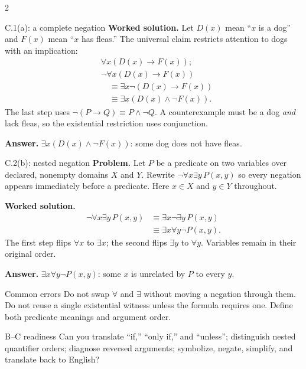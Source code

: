 \documentclass[10pt]{article}
\begin{document}
\begin{multicols}{2}
\begin{workedbox}{C.1(a): a complete negation}
\textbf{Worked solution.} Let $D(x)$ mean ``$x$ is a dog'' and $F(x)$ mean
``$x$ has fleas.'' The universal claim restricts attention to dogs with an
implication:
\[
\begin{aligned}
&\forall x(D(x)\to F(x));\\
&\neg\forall x(D(x)\to F(x))\\
&\quad\equiv\exists x\neg(D(x)\to F(x))\\
&\quad\equiv\exists x(D(x)\land\neg F(x)).
\end{aligned}
\]
The last step uses $\neg(P\to Q)\equiv P\land\neg Q$. A counterexample must
be a dog \emph{and} lack fleas, so the existential restriction uses conjunction.

\textbf{Answer.} $\exists x(D(x)\land\neg F(x))$: some dog does not have fleas.
\end{workedbox}

\begin{workedbox}{C.2(b): nested negation}
\textbf{Problem.} Let $P$ be a predicate on two variables over declared,
nonempty domains $X$ and $Y$. Rewrite $\neg\forall x\exists y\,P(x,y)$ so
every negation appears immediately before a predicate. Here $x\in X$ and
$y\in Y$ throughout.

\textbf{Worked solution.}
\[
\begin{aligned}
\neg\forall x\exists y\,P(x,y)
&\equiv\exists x\neg\exists y\,P(x,y)\\
&\equiv\exists x\forall y\neg P(x,y).
\end{aligned}
\]
The first step flips $\forall x$ to $\exists x$; the second flips
$\exists y$ to $\forall y$. Variables remain in their original order.

\textbf{Answer.} $\exists x\forall y\neg P(x,y)$: some $x$ is unrelated by
$P$ to every $y$.
\end{workedbox}

\begin{warningbox}{Common errors}
Do not swap $\forall$ and $\exists$ without moving a negation through them.
Do not reuse a single existential witness unless the formula requires one.
Define both predicate meanings and argument order.
\end{warningbox}

\begin{checklistbox}{B--C readiness}
Can you translate ``if,'' ``only if,'' and ``unless''; distinguish nested
quantifier orders; diagnose reversed arguments; symbolize, negate, simplify,
and translate back to English?
\end{checklistbox}
\end{multicols}
\end{document}
